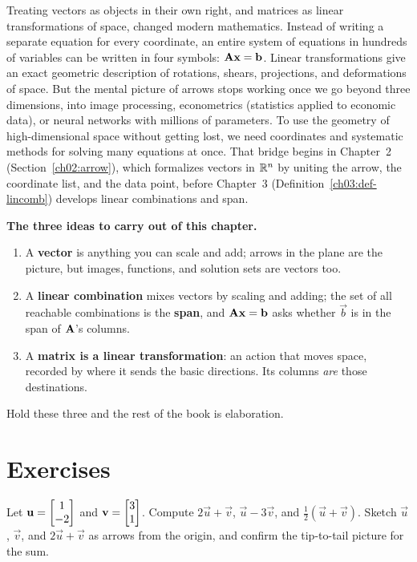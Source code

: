 \begin{historybox}
Treating vectors as objects in their own right, and matrices as linear transformations of space,
changed modern mathematics. Instead of writing a separate equation for every coordinate, an entire
system of equations in hundreds of variables can be written in four symbols: $\mathbf{A}\mathbf{x} = \mathbf{b}$. Linear
transformations give an exact geometric description of rotations, shears, projections, and deformations
of space. But the mental picture of arrows stops working once we go beyond
three dimensions, into image processing, econometrics (statistics applied to economic data), or neural
networks with millions of parameters.
To use the geometry of high-dimensional space without getting lost, we need coordinates
and systematic methods for solving many equations at once. That bridge begins in Chapter~2
(Section~\ref{ch02:arrow}), which formalizes vectors in $\mathbb{R}^n$ by uniting the arrow, the coordinate
list, and the data point, before Chapter~3 (Definition~\ref{ch03:def-lincomb}) develops linear
combinations and span.
\end{historybox}

\begin{focusbox}
\textbf{The three ideas to carry out of this chapter.}
\begin{enumerate}
  \item A \textbf{vector} is anything you can scale and add; arrows in the plane are the picture, but
  images, functions, and solution sets are vectors too.
  \item A \textbf{linear combination} mixes vectors by scaling and adding; the set of all reachable
  combinations is the \textbf{span}, and $\mathbf{A}\mathbf{x}=\mathbf{b}$ asks whether $\vec b$ is in the span of
  $\mathbf{A}$'s columns.
  \item A \textbf{matrix is a linear transformation}: an action that moves space, recorded by where it
  sends the basic directions. Its columns \emph{are} those destinations.
\end{enumerate}
Hold these three and the rest of the book is elaboration.
\end{focusbox}

\section{Exercises}

\begin{exercise}
Let $\mathbf{u} = \begin{bmatrix}1\\-2\end{bmatrix}$ and $\mathbf{v} = \begin{bmatrix}3\\1\end{bmatrix}$. Compute $2\vec u + \vec v$,
$\vec u - 3\vec v$, and $\tfrac12(\vec u + \vec v)$. Sketch $\vec u$, $\vec v$, and $2\vec u + \vec v$
as arrows from the origin, and confirm the tip-to-tail picture for the sum.
\end{exercise}

